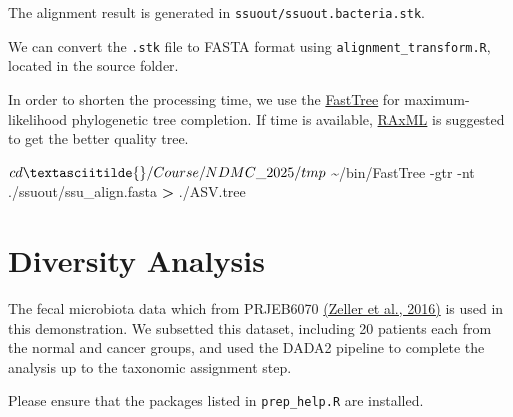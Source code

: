\documentclass[
]{article}
\newenvironment{Shaded}{\begin{snugshade}}{\end{snugshade}}
\newcommand{\AttributeTok}[1]{\textcolor[rgb]{0.13,0.29,0.53}{#1}}
\newcommand{\ExtensionTok}[1]{#1}
\newcommand{\NormalTok}[1]{#1}
\newcommand{\OperatorTok}[1]{\textcolor[rgb]{0.81,0.36,0.00}{\textbf{#1}}}
\begin{document}
The alignment result is generated in
\texttt{ssuout/ssuout.bacteria.stk}.

We can convert the \texttt{.stk} file to FASTA format using
\texttt{alignment\_transform.R}, located in the source folder.

\begin{Shaded}
\end{Shaded}

In order to shorten the processing time, we use the
\href{http://www.microbesonline.org/fasttree/}{FastTree} for
maximum-likelihood phylogenetic tree completion. If time is available,
\href{https://cme.h-its.org/exelixis/web/software/raxml/}{RAxML} is
suggested to get the better quality tree.

\begin{Shaded}
\begin{Highlighting}[]
\ExtensionTok{$}\NormalTok{ cd \textasciitilde{}/Course/NDMC\_2025/tmp}
\ExtensionTok{$}\NormalTok{ \textasciitilde{}/bin/FastTree }\AttributeTok{{-}gtr} \AttributeTok{{-}nt}\NormalTok{ ./ssuout/ssu\_align.fasta }\OperatorTok{\textgreater{}}\NormalTok{ ./ASV.tree}
\end{Highlighting}
\end{Shaded}

\hypertarget{diversity-analysis}{%
\section{Diversity Analysis}\label{diversity-analysis}}

The fecal microbiota data which from PRJEB6070
\href{https://pubmed.ncbi.nlm.nih.gov/25432777/}{(Zeller et al., 2016)}
is used in this demonstration. We subsetted this dataset, including 20
patients each from the normal and cancer groups, and used the DADA2
pipeline to complete the analysis up to the taxonomic assignment step.

Please ensure that the packages listed in \texttt{prep\_help.R} are
installed.
\end{document}
